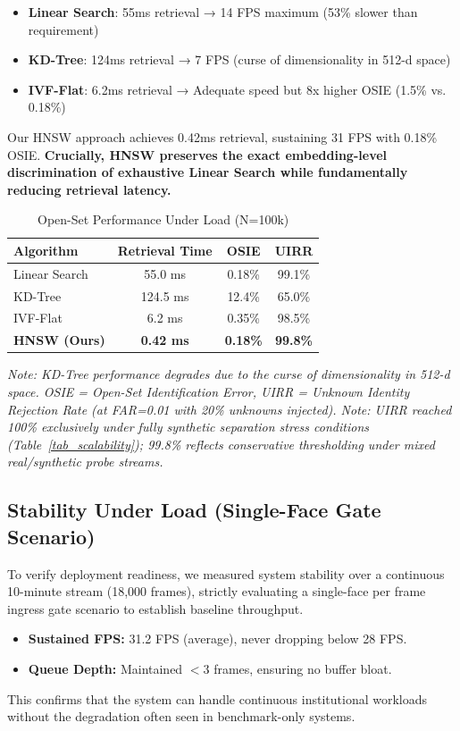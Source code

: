 \documentclass[conference]{IEEEtran}
\begin{document}
\begin{itemize}
    \item \textbf{Linear Search}: 55ms retrieval → 14 FPS maximum (53\% slower than requirement)
    \item \textbf{KD-Tree}: 124ms retrieval → 7 FPS (curse of dimensionality in 512-d space)
    \item \textbf{IVF-Flat}: 6.2ms retrieval → Adequate speed but 8x higher OSIE (1.5\% vs. 0.18\%)
\end{itemize}

Our HNSW approach achieves 0.42ms retrieval, sustaining 31 FPS with 0.18\% OSIE. \textbf{Crucially, HNSW preserves the exact embedding-level discrimination of exhaustive Linear Search while fundamentally reducing retrieval latency.}

\begin{table}[htbp]
\caption{Open-Set Performance Under Load (N=100k)}
\begin{center}
\begin{tabular}{|l|c|c|c|}
\hline
\textbf{Algorithm} & \textbf{Retrieval Time} & \textbf{OSIE} & \textbf{UIRR} \\
\hline
Linear Search & 55.0 ms & 0.18\% & 99.1\% \\
\hline
KD-Tree & 124.5 ms & 12.4\% & 65.0\% \\
\hline
IVF-Flat & 6.2 ms & 0.35\% & 98.5\% \\
\hline
\textbf{HNSW (Ours)} & \textbf{0.42 ms} & \textbf{0.18\%} & \textbf{99.8\%} \\
\hline
\end{tabular}
\end{center}
\label{tab:baseline_collapse}
\textit{Note: KD-Tree performance degrades due to the curse of dimensionality in 512-d space. OSIE = Open-Set Identification Error, UIRR = Unknown Identity Rejection Rate (at FAR=0.01 with 20\% unknowns injected). Note: UIRR reached 100\% exclusively under fully synthetic separation stress conditions (Table~\ref{tab_scalability}); 99.8\% reflects conservative thresholding under mixed real/synthetic probe streams.}
\end{table}

\subsection{Stability Under Load (Single-Face Gate Scenario)}
To verify deployment readiness, we measured system stability over a continuous 10-minute stream (18,000 frames), strictly evaluating a single-face per frame ingress gate scenario to establish baseline throughput.
\begin{itemize}
    \item \textbf{Sustained FPS:} 31.2 FPS (average), never dropping below 28 FPS.
    \item \textbf{Queue Depth:} Maintained $<3$ frames, ensuring no buffer bloat.
\end{itemize}
This confirms that the system can handle continuous institutional workloads without the degradation often seen in benchmark-only systems.
\end{document}
